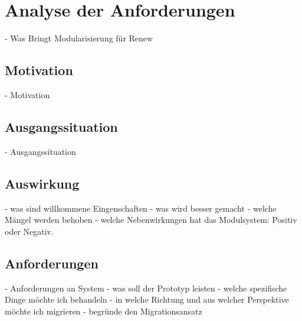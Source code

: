 \chapter{Analyse der Anforderungen}\label{cha:anforderungen}
- Was Bringt Modularisierung für Renew

\section{Motivation}\label{sec:motivation}
	- Motivation 

\section{Ausgangssituation} \label{sec:ausgangssituation}
	- Ausgangssituation 

\section{Auswirkung} \label{auswirkung}
	- was sind willkommene Eingenschaften 
	- was wird besser gemacht 
	- welche Mängel werden behoben 
	- welche Nebenwirkungen hat das Modulsystem: Positiv oder Negativ. 

\section{Anforderungen} \label{sec:anforderungen}
- Anforderungen an System 
	- was soll der Prototyp leisten 
	- welche spezifische Dinge möchte ich behandeln 
	- in welche Richtung und aus welcher Perspektive möchte ich migrieren 
	- begründe den Migrationsansatz 





